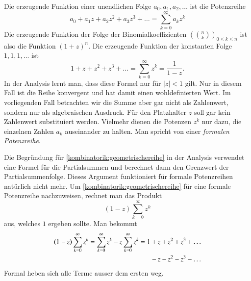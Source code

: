 Die erzeugende Funktion einer unendlichen Folge $a_0,a_1,a_2,\dots$ ist
die Potenzreihe
\[
a_0+a_1z+a_2z^2+a_3z^3+\dots=\sum_{k=0}^\infty a_kz^k
\]
Die erzeugende Funktion der Folge der Binomialkoeffizienten $\left(\binom{n}{k}\right)_{0\le k\le  n}$ ist also die Funktion $(1+z)^n$.
Die erzeugende Funktion der konstanten Folge $1,1,1,\dots$ ist
\begin{equation}
1+z+z^2+z^3+\dots=\sum_{k=0}^\infty z^k=\frac1{1-z}.
\label{kombinatorik:geometrischereihe}
\end{equation}
In der Analysis lernt man, dass diese Formel nur für $|z|<1$ gilt.
Nur in diesem Fall ist die Reihe konvergent und hat damit einen
wohldefinierten Wert.
Im vorliegenden Fall betrachten wir die Summe aber gar nicht als Zahlenwert,
sondern nur als algebraischen Ausdruck.
Für den Platzhalter $z$ soll gar kein Zahlenwert substituiert werden.
Vielmehr dienen die Potenzen $z^k$ nur dazu, die einzelnen Zahlen $a_k$
auseinander zu halten.
Man spricht von einer {\em formalen Potenzreihe}.

Die Begründung für \eqref{kombinatorik:geometrischereihe} in der 
Analysis verwendet eine Formel für die Partialsummen und berechnet
dann den Grenzwert der Partialsummenfolge.
Dieses Argument funktioniert für formale Potenzreihen natürlich nicht
mehr.
Um \eqref{kombinatorik:geometrischereihe} für eine formale Potenzreihe
nachzuweisen, rechnet man das Produkt
\[
(1-z)\sum_{k=0}^\infty z^k
\]
aus, welches $1$ ergeben sollte.
Man bekommt
\begin{align*}
(1-z)\sum_{k=0}^\infty z^k
=
\sum_{k=0}^\infty z^k - z\sum_{k=0}^\infty z^k
&=
1 + z + z^2 + z^3+\dots
\\
&\phantom{\mathstrut=1}
-z-z^2-z^3-\dots
\end{align*}
Formal heben sich alle Terme ausser dem ersten weg.

